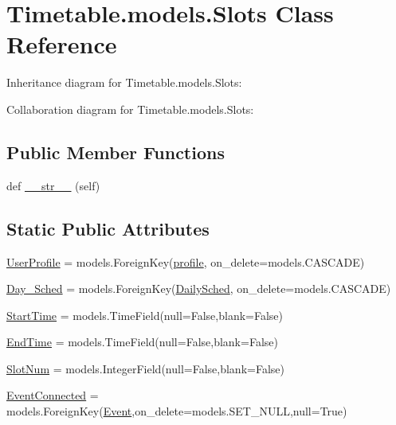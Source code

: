 \hypertarget{classTimetable_1_1models_1_1Slots}{}\section{Timetable.\+models.\+Slots Class Reference}
\label{classTimetable_1_1models_1_1Slots}


Inheritance diagram for Timetable.\+models.\+Slots\+:


Collaboration diagram for Timetable.\+models.\+Slots\+:
\subsection*{Public Member Functions}
\begin{DoxyCompactItemize}
\item 
def \hyperlink{classTimetable_1_1models_1_1Slots_a644a0cc352eff9bfc5477c19c7d91e71}{\+\_\+\+\_\+str\+\_\+\+\_\+} (self)
\end{DoxyCompactItemize}
\subsection*{Static Public Attributes}
\begin{DoxyCompactItemize}
\item 
\hyperlink{classTimetable_1_1models_1_1Slots_af35ce0385f56fb20baaeab2d11e821e3}{User\+Profile} = models.\+Foreign\+Key(\hyperlink{classprofiles_1_1models_1_1profile}{profile}, on\+\_\+delete=models.\+C\+A\+S\+C\+A\+DE)
\item 
\hyperlink{classTimetable_1_1models_1_1Slots_a16ad17531e152e0661b601658c47a157}{Day\+\_\+\+Sched} = models.\+Foreign\+Key(\hyperlink{classTimetable_1_1models_1_1DailySched}{Daily\+Sched}, on\+\_\+delete=models.\+C\+A\+S\+C\+A\+DE)
\item 
\hyperlink{classTimetable_1_1models_1_1Slots_ad9dd5ece43699c860c9613bbc546c908}{Start\+Time} = models.\+Time\+Field(null=False,blank=False)
\item 
\hyperlink{classTimetable_1_1models_1_1Slots_aebf68749233425604ea55cece33652f3}{End\+Time} = models.\+Time\+Field(null=False,blank=False)
\item 
\hyperlink{classTimetable_1_1models_1_1Slots_ab3e185c541695f0cc562bb354df36a57}{Slot\+Num} = models.\+Integer\+Field(null=False,blank=False)
\item 
\hyperlink{classTimetable_1_1models_1_1Slots_a3fadb94b957239d32884167f6414e140}{Event\+Connected} = models.\+Foreign\+Key(\hyperlink{classTimetable_1_1models_1_1Event}{Event},on\+\_\+delete=models.\+S\+E\+T\+\_\+\+N\+U\+LL,null=True)
\end{DoxyCompactItemize}


